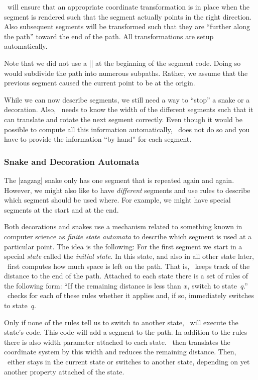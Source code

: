 \pgfname\ will ensure that an appropriate coordinate transformation
is in place when the segment is rendered such that
the segment actually points in the right direction. Also
subsequent segments will be transformed such that they are
``further along the path'' toward the end of the path.
All transformations are setup automatically.

Note that we did not use a |\pgfpathmoveto{\pgfpointorigin}| at the
beginning of the segment code. Doing so would subdivide the path into
numerous subpaths. Rather, we assume that the previous segment caused
the current point to be at the origin.

While we can now describe segments, we still need a way to ``stop''
a snake or a decoration. Also, \pgfname\ needs to know the width of 
the different segments such that it can translate and rotate the 
next segment correctly.
Even though it would be possible to compute all this information
automatically, \pgfname\ does not do so and you have to provide the
information ``by hand'' for each segment. 


\subsubsection{Snake and Decoration Automata}

The |zagzag| snake only has one segment that is repeated again and
again. However, we might also like to have \emph{different} segments
and use rules to describe which segment should be used where. For
example, we might have special segments at the start and at the end.

Both decorations and snakes use a mechanism related to something known
in computer science as \emph{finite state automata} to describe which
segment is used at a particular point. The idea is the following: For
the first segment we 
start in a special \emph{state} called the \emph{initial state}. In
this state, and also in all other state later, \pgfname\ first
computes how much space is left on the path. That is, \pgfname\ keeps
track of the distance to the end of the path. Attached to each state 
there is a set of rules of the following form: ``If the remaining 
distance is less than $x$, switch to state~$q$.'' \pgfname\ checks 
for each of these rules whether it applies and, if so, immediately 
switches to state~$q$.

Only if none of the rules tell us to switch to another
state, \pgfname\ will execute the state's code. This code will add a
segment to the path. In addition to the rules there is also width
parameter attached to each state. \pgfname\ then translates the
coordinate system by this width and reduces the remaining distance.
Then, \pgfname\ either stays in the current state or switches to
another state, depending on yet another property attached of the
state.

